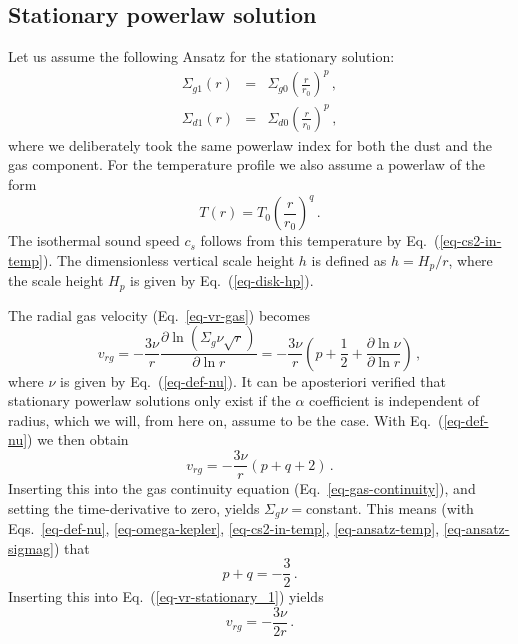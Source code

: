 \documentclass{aa}
\def\comma{\,,}
\def\fullstop{\,.}
\begin{document}
\subsection{Stationary powerlaw solution}
\label{sec-stationary-solution}
%
Let us assume the following Ansatz for the stationary solution:
\begin{eqnarray}
\Sigma_{g1}(r) &=& \Sigma_{g0} \left(\frac{r}{r_0}\right)^p\comma\label{eq-ansatz-sigmag}\\
\Sigma_{d1}(r) &=& \Sigma_{d0} \left(\frac{r}{r_0}\right)^p\comma\label{eq-ansatz-sigmad}
\end{eqnarray}
where we deliberately took the same powerlaw index for both the dust and
the gas component. For the temperature profile we also assume a powerlaw
of the form
\begin{equation}\label{eq-ansatz-temp}
T(r) = T_0 \left(\frac{r}{r_0}\right)^q\fullstop
\end{equation}
The isothermal sound speed $c_s$ follows from this temperature by
Eq.~(\ref{eq-cs2-in-temp}).  The dimensionless vertical scale height $h$ is
defined as $h=H_p/r$, where the scale height $H_p$ is given by
Eq.~(\ref{eq-disk-hp}).

The radial gas velocity (Eq.~\ref{eq-vr-gas}) becomes
\begin{equation}\label{eq-vrg-as-dbllog-dir}
  v_{rg} = -\frac{3\nu}{r} \frac{\partial\ln(\Sigma_g\nu\sqrt{r})}{\partial \ln r}
  = -\frac{3\nu}{r}\left(p+\frac{1}{2}+\frac{\partial\ln\nu}{\partial \ln r}\right)\comma
\end{equation}
where $\nu$ is given by Eq.~(\ref{eq-def-nu}). It can be aposteriori verified
that stationary powerlaw solutions only exist if the $\alpha$ coefficient is
independent of radius, which we will, from here on, assume to be the case.
With Eq.~(\ref{eq-def-nu}) we then obtain
\begin{equation}\label{eq-vr-stationary_1}
  v_{rg} = -\frac{3\nu}{r}\left(p+q+2\right)\fullstop
\end{equation}
Inserting this into the gas continuity equation (Eq.~\ref{eq-gas-continuity}),
and setting the time-derivative to zero, yields $\Sigma_g\nu=$constant. This
means (with Eqs.~\ref{eq-def-nu}, \ref{eq-omega-kepler}, \ref{eq-cs2-in-temp},
\ref{eq-ansatz-temp}, \ref{eq-ansatz-sigmag}) that
\begin{equation}\label{eq-powerlaw-sum-steady}
p+q=-\frac{3}{2}\fullstop
\end{equation}
Inserting this into Eq.~(\ref{eq-vr-stationary_1}) yields
\begin{equation}\label{eq-vr-in-nu-r}
  v_{rg} = -\frac{3\nu}{2r}\fullstop
\end{equation}
\end{document}
